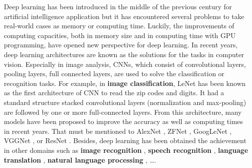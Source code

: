 \documentclass[review]{elsarticle}
\begin{document}
Deep learning \cite{lecun2015deep} has been introduced in the middle of the previous century for artificial intelligence application but it has encountered several problems to take real-world cases as memory or computing time. Luckily, the improvements of computing capacities, both in memory size and in computing time with GPU programming, have opened new perspective for deep learning. In recent years, deep learning architectures are known as the solutions for the tasks in computer vision. Especially in image analysis, CNNs, which consist of convolutional layers, pooling layers, full connected layers, are used to solve the classification or recognition tasks.
For example, in \textbf{image classification}, LeNet \cite{lecun1998gradient} has been known as the first architecture of CNN to read the zip codes and digits. It had a standard structure stacked convolutional layers (normalization and max-pooling) are followed by one or more full-connected layers. From this architecture, many models have been proposed to improve the accuracy as well as computing times in recent years. That must be mentioned to AlexNet \cite{krizhevsky2012imagenet}, ZFNet \cite{zeiler2014visualizing}, GoogLeNet \cite{szegedy2015going}, VGGNet \cite{simonyan2014very}, or ResNet \cite{he2016deep}. Besides, deep learning has been obtained the achievement in other domains such as \textbf{image recognition} \cite{szegedy2015going,farabet2013learning,li2015convolutional}, \textbf{speech recognition} \cite{mikolov2011strategies, hinton2012deep}, \textbf{language translation} \cite{jean2014using, sutskever2014sequence}, \textbf{natural language processing} \cite{lecun2015deep, collobert2011natural, collobert2008unified}, \ldots.

\end{document}
